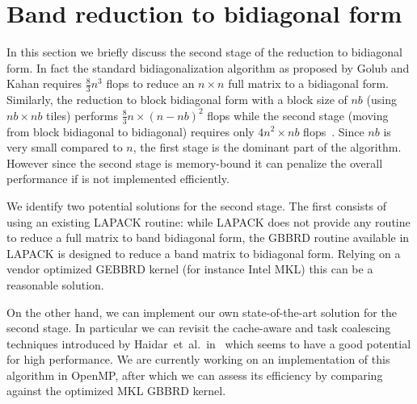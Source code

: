 \section{Band reduction to bidiagonal form}\label{sec:bidiag}
In this section we briefly discuss the second stage of the reduction
to bidiagonal form.
In fact the standard bidiagonalization
algorithm as proposed by Golub and Kahan requires $\frac{8}{3}n^3$
flops to reduce an $n \times n$ full matrix to a bidiagonal form.
Similarly, the reduction to block bidiagonal form with a
block size of $nb$ (using $nb \times nb$ tiles) performs
$\frac{8}{3} n\times (n-nb)^2$ flops while the second stage
(moving from block bidiagonal to bidiagonal)
requires only $4 n^2\times nb$ flops~\cite{ltaief2013high}.
Since $nb$ is very small compared to $n$,
the first stage is the dominant part of the algorithm.
However since the second stage is memory-bound it can penalize the
overall performance if is not implemented efficiently.

We identify two potential solutions for the second stage.
The first consists of using an existing LAPACK routine:
while LAPACK does not provide any routine to reduce a
full matrix to band bidiagonal form,
the GBBRD routine available in LAPACK is designed to
reduce a band matrix to bidiagonal form.
Relying on a vendor optimized GEBBRD kernel
(for instance Intel MKL) this can be a reasonable solution.

On the other hand, we can implement our own state-of-the-art
solution for the second stage.
In particular we can revisit the cache-aware
and task coalescing techniques introduced by
Haidar~et~al\@.~in~\cite{haidar2011parallel}
which seems to have a good potential for high performance.
We are currently working on an implementation of this
algorithm in OpenMP,
after which we can assess its efficiency by
comparing against the optimized MKL GBBRD kernel.
